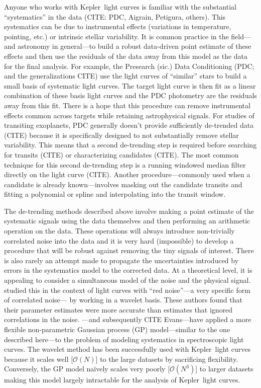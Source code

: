 \documentclass[12pt,preprint]{aastex}
\newcommand{\project}[1]{{\sffamily #1}}
\newcommand{\kepler}{\project{Kepler}}
\begin{document}
Anyone who works with \kepler\ light curves is familiar with the substantial
``systematics'' in the data (CITE: PDC, Aigrain, Petigura, others).
This systematics can be due to instrumental effects (variations in
temperature, pointing, etc.) or intrinsic stellar variability.
It is common practice in the field---and astronomy in general---to build a
robust data-driven point estimate of these effects and then use the residuals
of the data away from this model as the data for the final analysis.
For example, the Presearch (sic.) Data Conditioning (PDC; and the
generalizations CITE) use the light curves of ``similar'' stars to build a
small basis of systematic light curves.
The target light curve is then fit as a linear combination of these basis
light curves and the PDC photometry are the residuals away from this fit.
There is a hope that this procedure can remove instrumental effects common
across targets while retaining astrophysical signals.
For studies of transiting exoplanets, PDC generally doesn't provide
sufficiently de-trended data (CITE) because it is specifically designed to not
substantially remove stellar variability.
This means that a second de-trending step is required before searching for
transits (CITE) or characterizing candidates (CITE).
The most common technique for this second de-trending step is a running
windowed median filter directly on the light curve (CITE).
Another procedure---commonly used when a candidate is already known---involves
masking out the candidate transits and fitting a polynomial or spline and
interpolating into the transit window.

The de-trending methods described above involve making a point estimate of the
systematic signals using the data themselves and then performing an arithmetic
operation on the data.
These operations will always introduce non-trivially correlated noise into the
data and it is very hard (impossible) to develop a procedure that will be
robust against removing the tiny signals of interest.
There is also rarely an attempt made to propagate the uncertainties introduced
by errors in the systematics model to the corrected data.
At a theoretical level, it is appealing to consider a simultaneous model of
the noise and the physical signal.
\citet{carter} studied this in the context of light curves with ``red
noise''---a very specific form of correlated noise--- by working in a wavelet
basis.
These authors found that their parameter estimates were more accurate than
estimates that ignored correlations in the noise.
\citet{gibson-gp}---and subsequently CITE Evans---have applied a more
flexible non-parametric Gaussian process (GP) model---similar to the one
described here---to the problem of modeling systematics in spectroscopic
light curves.
The wavelet method has been successfully used with \kepler\ light
curves because it scales well [$\mathcal{O}(N)$] to the large datasets by
sacrificing flexibility.
Conversely, the GP model na\"ively scales very poorly [$\mathcal{O}(N^3)$] to
larger datasets making this model largely intractable for the analysis of
 \kepler\ light curves.
\end{document}
